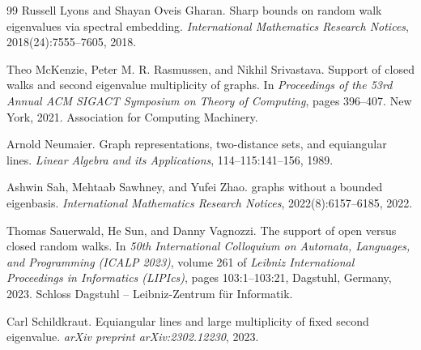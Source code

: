 \documentclass[11pt]{article}
\theoremstyle{definition}
\theoremstyle{remark}
\begin{document}
\begin{thebibliography}{99}
Russell Lyons and Shayan Oveis Gharan.
\newblock Sharp bounds on random walk eigenvalues via spectral embedding.
\newblock \emph{International Mathematics Research Notices}, 2018(24):7555--7605, 2018.

Theo McKenzie, Peter M. R. Rasmussen, and Nikhil Srivastava.
\newblock Support of closed walks and second eigenvalue multiplicity of graphs.
\newblock In \emph{Proceedings of the 53rd Annual ACM SIGACT Symposium on Theory of Computing}, pages 396--407. New York, 2021. Association for Computing Machinery.

Arnold Neumaier.
\newblock Graph representations, two-distance sets, and equiangular lines.
\newblock \emph{Linear Algebra and its Applications}, 114--115:141--156, 1989.

Ashwin Sah, Mehtaab Sawhney, and Yufei Zhao.
 graphs without a bounded eigenbasis.
\newblock \emph{International Mathematics Research Notices}, 2022(8):6157--6185, 2022.

Thomas Sauerwald, He Sun, and Danny Vagnozzi.
\newblock The support of open versus closed random walks.
\newblock In \emph{50th International Colloquium on Automata, Languages, and Programming (ICALP 2023)}, volume 261 of \emph{Leibniz International Proceedings in Informatics (LIPIcs)}, pages 103:1--103:21, Dagstuhl, Germany, 2023. Schloss Dagstuhl -- Leibniz-Zentrum f{\"u}r Informatik.

Carl Schildkraut.
\newblock Equiangular lines and large multiplicity of fixed second eigenvalue.
\newblock \emph{arXiv preprint arXiv:2302.12230}, 2023.

\end{thebibliography}
\end{document}
